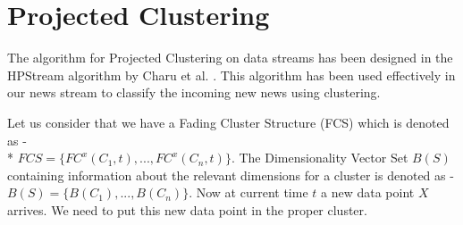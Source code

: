 \documentclass[a4paper,12bp]{report}
\begin{document}
\section{Projected Clustering}
\label{sec:proj_clustering}
The algorithm for Projected Clustering on data streams has been designed in the HPStream algorithm by Charu et al. \cite{Aggarwal:2005}. This algorithm has been used effectively in our news stream to classify the incoming new news using clustering. 

Let us consider that we have a Fading Cluster Structure (FCS) which is denoted as - \\* $FCS = \{ FC^x(C_1, t), ... , FC^x(C_n, t)\}$. The Dimensionality Vector Set $B(S)$ containing information about the relevant dimensions for a cluster is denoted as - $B(S) = \{ B(C_1), ... , B(C_n)\}$. Now at current time $t$ a new data point $X$ arrives. We need to put this new data point in the proper cluster. 
\end{document}
